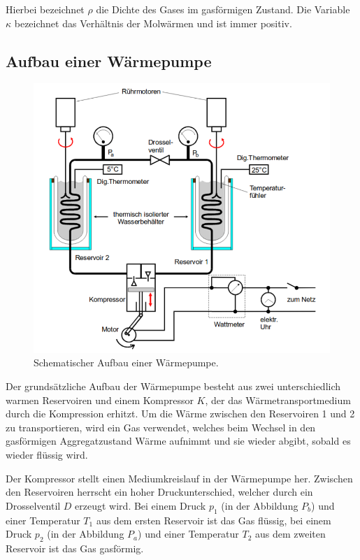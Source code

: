     Hierbei bezeichnet $\rho$ die Dichte des Gases im gasförmigen Zustand.
    Die Variable $\kappa$ bezeichnet das Verhältnis der Molwärmen und ist immer positiv.


\subsection{Aufbau einer Wärmepumpe}
\label{sec:Aufbau}

    \begin{figure}
      \centering
      \includegraphics[scale=0.8]{content/img/aufbau.pdf}
      \caption{Schematischer Aufbau einer Wärmepumpe.}
      \label{fig:aufbau}
    \end{figure}


    Der grundsätzliche Aufbau der Wärmepumpe besteht aus zwei unterschiedlich warmen Reservoiren und einem Kompressor $K$,
    der das Wärmetransportmedium durch die Kompression erhitzt.
    Um die Wärme zwischen den Reservoiren 1 und 2 zu transportieren,
    wird ein Gas verwendet,
    welches beim Wechsel in den gasförmigen
    Aggregatzustand Wärme aufnimmt und sie wieder abgibt,
    sobald es wieder flüssig wird.

    Der Kompressor stellt einen Mediumkreislauf in der Wärmepumpe her.
    Zwischen den Reservoiren herrscht ein hoher Druckunterschied,
    welcher durch ein Drosselventil $D$ erzeugt wird.
    Bei einem Druck $p_1$ (in der Abbildung $P_b$) und einer Temperatur $T_1$ aus dem ersten Reservoir ist das Gas flüssig,
    bei einem Druck $p_2$ (in der Abbildung $P_a$) und einer Temperatur $T_2$ aus dem zweiten Reservoir ist das Gas gasförmig.

